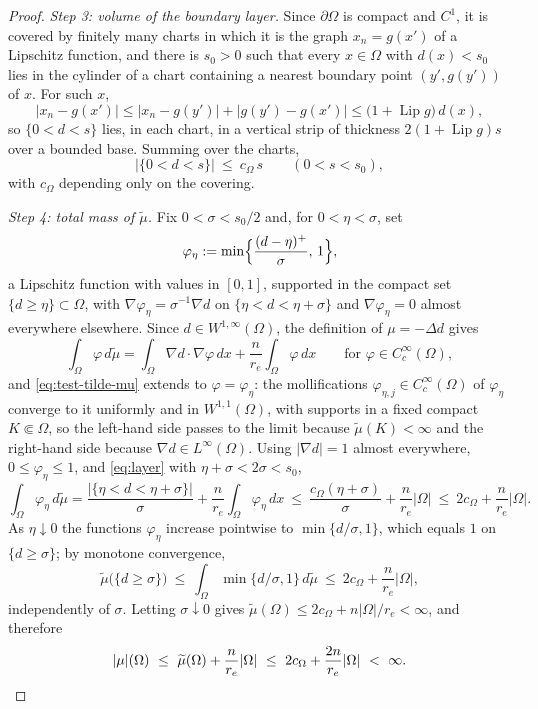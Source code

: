\documentclass[11pt]{article}
\newcommand{\abs}[1]{\lvert #1\rvert}
\theoremstyle{definition}
\theoremstyle{remark}
\begin{document}
\begin{proof}
\emph{Step 3: volume of the boundary layer.}
Since $\partial\Omega$ is compact and $C^1$, it is covered by finitely many
charts in which it is the graph $x_n=g(x')$ of a Lipschitz function, and
there is $s_0>0$ such that every $x\in\Omega$ with $d(x)<s_0$ lies in the
cylinder of a chart containing a nearest boundary point $(y',g(y'))$ of $x$.
For such $x$,
\[
\abs{x_n-g(x')}\le\abs{x_n-g(y')}+\abs{g(y')-g(x')}
\le\bigl(1+\operatorname{Lip}g\bigr)\,d(x),
\]
so $\{0<d<s\}$ lies, in each chart, in a vertical strip of thickness
$2(1+\operatorname{Lip}g)s$ over a bounded base. Summing over the charts,
\begin{equation}\label{eq:layer}
\abs{\{0<d<s\}}\ \le\ c_\Omega\,s\qquad(0<s<s_0),
\end{equation}
with $c_\Omega$ depending only on the covering.

\emph{Step 4: total mass of $\widetilde\mu$.}
Fix $0<\sigma<s_0/2$ and, for $0<\eta<\sigma$, set
\[
\varphi_{\eta}:=\min\Bigl\{\frac{(d-\eta)^+}{\sigma},\,1\Bigr\},
\]
a Lipschitz function with values in $[0,1]$, supported in the compact set
$\{d\ge\eta\}\subset\Omega$, with $\nabla\varphi_\eta=\sigma^{-1}\nabla d$
on $\{\eta<d<\eta+\sigma\}$ and $\nabla\varphi_\eta=0$ almost everywhere
elsewhere. Since $d\in W^{1,\infty}(\Omega)$, the definition of $\mu=-\Delta d$
gives
\begin{equation}\label{eq:test-tilde-mu}
\int_\Omega\varphi\,d\widetilde\mu
=\int_\Omega\nabla d\cdot\nabla\varphi\,dx+\frac n{r_e}\int_\Omega\varphi\,dx
\qquad\text{for }\varphi\in C_c^\infty(\Omega),
\end{equation}
and \eqref{eq:test-tilde-mu} extends to $\varphi=\varphi_\eta$: the
mollifications $\varphi_{\eta,j}\in C_c^\infty(\Omega)$ of $\varphi_\eta$
converge to it uniformly and in $W^{1,1}(\Omega)$, with supports in a fixed
compact $K\Subset\Omega$, so the left-hand side passes to the limit because
$\widetilde\mu(K)<\infty$ and the right-hand side because
$\nabla d\in L^\infty(\Omega)$. Using $\abs{\nabla d}=1$ almost everywhere,
$0\le\varphi_\eta\le1$, and \eqref{eq:layer} with $\eta+\sigma<2\sigma<s_0$,
\[
\int_\Omega\varphi_{\eta}\,d\widetilde\mu
=\frac{\abs{\{\eta<d<\eta+\sigma\}}}{\sigma}+\frac n{r_e}\int_\Omega\varphi_\eta\,dx
\ \le\ \frac{c_\Omega(\eta+\sigma)}{\sigma}+\frac n{r_e}\abs{\Omega}
\ \le\ 2c_\Omega+\frac n{r_e}\abs{\Omega}.
\]
As $\eta\downarrow0$ the functions $\varphi_\eta$ increase pointwise to
$\min\{d/\sigma,1\}$, which equals $1$ on $\{d\ge\sigma\}$; by monotone
convergence,
\[
\widetilde\mu\bigl(\{d\ge\sigma\}\bigr)
\ \le\ \int_\Omega\min\{d/\sigma,1\}\,d\widetilde\mu
\ \le\ 2c_\Omega+\frac n{r_e}\abs{\Omega},
\]
independently of $\sigma$. Letting $\sigma\downarrow0$ gives
$\widetilde\mu(\Omega)\le2c_\Omega+n\abs{\Omega}/r_e<\infty$, and therefore
\[
\abs{\mu}(\Omega)\ \le\ \widetilde\mu(\Omega)+\frac n{r_e}\abs{\Omega}
\ \le\ 2c_\Omega+\frac{2n}{r_e}\abs{\Omega}\ <\ \infty . \qedhere
\]
\end{proof}
\end{document}
